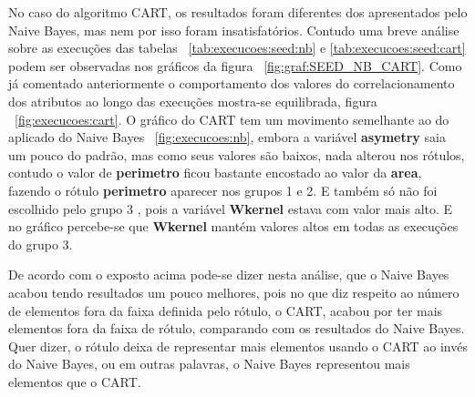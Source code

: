 No caso do algoritmo CART, os resultados foram diferentes dos  apresentados pelo Naive Bayes, mas nem por isso foram insatisfatórios. Contudo uma breve análise sobre as execuções das tabelas ~\ref{tab:execucoes:seed:nb} e \ref{tab:execucoes:seed:cart} podem ser observadas nos gráficos da figura ~\ref{fig:graf:SEED_NB_CART}. Como já comentado anteriormente o comportamento dos valores do correlacionamento dos atributos ao longo das execuções mostra-se equilibrada, figura ~\ref{fig:execucoes:cart}. O gráfico do CART tem um movimento semelhante ao do aplicado do Naive Bayes ~\ref{fig:execucoes:nb}, embora a variável \textbf{asymetry} saia um pouco do padrão, mas como seus valores são baixos, nada alterou nos rótulos, contudo  o valor de \textbf{perimetro} ficou bastante encostado ao valor da \textbf{area}, fazendo o rótulo \textbf{perimetro} aparecer nos grupos 1 e 2. E também só não foi escolhido pelo grupo 3 , pois  a variável \textbf{Wkernel} estava com valor mais alto. E no gráfico percebe-se que  \textbf{Wkernel} mantém valores altos em todas as execuções do grupo 3.

De acordo com o exposto acima pode-se dizer nesta análise, que o Naive Bayes acabou tendo resultados um pouco melhores, pois no que diz respeito ao número de elementos fora da faixa definida pelo rótulo, o CART, acabou por ter mais elementos fora da faixa de rótulo, comparando com os resultados do Naive Bayes. Quer dizer, o rótulo deixa de representar mais elementos usando o CART ao invés do Naive Bayes, ou em outras palavras, o Naive Bayes representou mais elementos que o CART.



